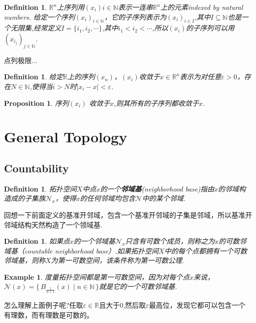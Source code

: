 \documentclass{article}
\newtheorem{proposition}[theorem]{Proposition}
\newtheorem{example}[theorem]{Example}
\newtheorem{definition}[theorem]{Definition}
\newcommand\Set[2]{\{\,#1\mid#2\,\}} %
\begin{document}
\begin{definition}
$\mathbb{R}^n$上序列用$(x_i)i\in\mathbb{N}$表示一连串$\mathbb{R}^n$上的元素indexed by natural numbers. 给定一个序列$(x_i)_{i\in\mathbb{N}}$，它的子序列表示为$(x_i)_{i \in I}$,其中$I \subseteq \mathbb{N}$也是一个无限集,经常定义$I = \{i_1,i_2,\cdots\}$,其中$i_1 < i_2 < \cdots$,所以$(x_i)$的子序列可以用$(x_{i_j})_{j \in \mathbb{N}}$.
\end{definition}

点列极限...

\begin{definition}
给定$\mathbb{R}$上的序列$(x_n)$，$(x_i)$收敛于$x \in \mathbb{R}^n$表示为对任意$\varepsilon > 0$，存在$N \in \mathbb{N}$,使得当$i > N$时$|x_i - x| < \varepsilon$.
\end{definition}

\begin{proposition}
序列$(x_i)$ 收敛于$x$,则其所有的子序列都收敛于$x$.
\end{proposition}

\newpage
\section{General Topology}
\subsection{Countability}

\begin{definition}
拓扑空间$X$中点$x$的一个\textbf{邻域基}(neighborhood base)指由$x$的邻域构造成的子集族$\mathcal{N}_x$，使得$x$的任何邻域均包含$\mathcal{N}$中的某个邻域.
\end{definition}

回想一下前面定义的基准开邻域，包含一个基准开邻域的子集是邻域，所以基准开邻域结构天然构造了一个领域基.

\begin{definition}
如果点$x$的一个邻域基$\mathcal{N}_x$只含有可数个成员，则称之为$x$的可数邻域基（countable neighborhood base）.如果拓扑空间$X$中的每个点都拥有一个可数邻域基，则称$X$为第一可数空间，该条件称为第一可数公理.
\end{definition}

\begin{example}
度量拓扑空间都是第一可数空间，因为对每个点$x$来说，$\mathcal{N}(x)=\Set{B_{\frac{1}{n+1}}(x)}{n\in \mathbb{N}}$就是它的一个可数邻域基.
\end{example}

怎么理解上面例子呢?任取$\varepsilon \in \mathbb{R}$且大于0,然后取$\varepsilon$最高位，发现它都可以包含一个有理数，而有理数是可数的。
\end{document}
